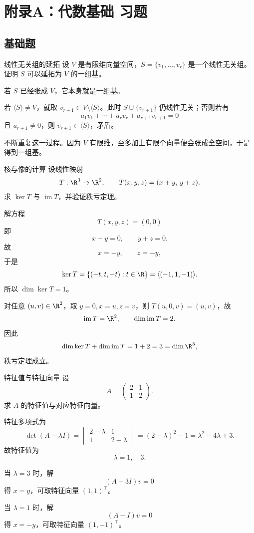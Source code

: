 \chapter{附录A：代数基础 习题}
\difficultykey

\section{基础题 \easy}

\begin{problem}{线性无关组的延拓}
\easy
设 $V$ 是有限维向量空间，$S=\{v_1,\dots,v_r\}$ 是一个线性无关组。证明 $S$ 可以延拓为 $V$ 的一组基。
\end{problem}
\begin{solution}
若 $S$ 已经张成 $V$，它本身就是一组基。

若 $\langle S\rangle\neq V$，就取 $v_{r+1}\in V\setminus\langle S\rangle$。此时 $S\cup\{v_{r+1}\}$ 仍线性无关；否则若有
\[
a_1v_1+\cdots+a_rv_r+a_{r+1}v_{r+1}=0
\]
且 $a_{r+1}\neq0$，则 $v_{r+1}\in\langle S\rangle$，矛盾。

不断重复这一过程。因为 $V$ 有限维，至多加上有限个向量便会张成全空间，于是得到一组基。
\end{solution}

\begin{problem}{核与像的计算}
\easy
设线性映射
\[
T:\R^3\to\R^2,
\qquad
T(x,y,z)=(x+y,\,y+z).
\]
求 $\ker T$ 与 $\operatorname{im}T$，并验证秩亏定理。
\end{problem}
\begin{solution}
解方程
\[
T(x,y,z)=(0,0)
\]
即
\[
x+y=0,
\qquad y+z=0.
\]
故
\[
x=-y,
\qquad z=-y,
\]
于是
\[
\ker T=\{(-t,t,-t):t\in\R\}=\langle(-1,1,-1)\rangle.
\]
所以 $\dim\ker T=1$。

对任意 $(u,v)\in\R^2$，取 $y=0,x=u,z=v$，则 $T(u,0,v)=(u,v)$，故
\[
\operatorname{im}T=\R^2,
\qquad \dim\operatorname{im}T=2.
\]
因此
\[
\dim\ker T+\dim\operatorname{im}T=1+2=3=\dim\R^3,
\]
秩亏定理成立。
\end{solution}

\begin{problem}{特征值与特征向量}
\easy
设
\[
A=\begin{pmatrix}2&1\\1&2\end{pmatrix}.
\]
求 $A$ 的特征值与对应特征向量。
\end{problem}
\begin{solution}
特征多项式为
\[
\det(A-\lambda I)=
\begin{vmatrix}2-\lambda&1\\1&2-\lambda\end{vmatrix}
=(2-\lambda)^2-1=\lambda^2-4\lambda+3.
\]
故特征值为
\[
\lambda=1,\quad 3.
\]

当 $\lambda=3$ 时，解
\[
(A-3I)v=0
\]
得 $x=y$，可取特征向量 $(1,1)^\top$。

当 $\lambda=1$ 时，解
\[
(A-I)v=0
\]
得 $x=-y$，可取特征向量 $(1,-1)^\top$。
\end{solution}

